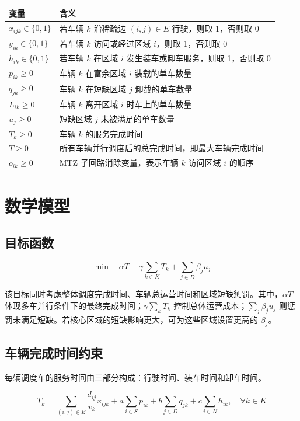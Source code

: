\documentclass[UTF8,a4paper,12pt]{ctexart}
\begin{document}
\begin{longtable}{>{\centering\arraybackslash}p{3cm}p{11cm}}
\toprule
变量 & 含义 \\
\midrule
\endhead
\(x_{ijk}\in\{0,1\}\) & 若车辆 \(k\) 沿稀疏边 \((i,j)\in E\) 行驶，则取 1，否则取 0 \\
\(y_{ik}\in\{0,1\}\) & 若车辆 \(k\) 访问或经过区域 \(i\)，则取 1，否则取 0 \\
\(h_{ik}\in\{0,1\}\) & 若车辆 \(k\) 在区域 \(i\) 发生装车或卸车服务，则取 1，否则取 0 \\
\(p_{ik}\ge 0\) & 车辆 \(k\) 在富余区域 \(i\) 装载的单车数量 \\
\(q_{jk}\ge 0\) & 车辆 \(k\) 在短缺区域 \(j\) 卸载的单车数量 \\
\(L_{ik}\ge 0\) & 车辆 \(k\) 离开区域 \(i\) 时车上的单车数量 \\
\(u_j\ge 0\) & 短缺区域 \(j\) 未被满足的单车数量 \\
\(T_k\ge 0\) & 车辆 \(k\) 的服务完成时间 \\
\(T\ge 0\) & 所有车辆并行调度后的总完成时间，即最大车辆完成时间 \\
\(o_{ik}\ge 0\) & MTZ 子回路消除变量，表示车辆 \(k\) 访问区域 \(i\) 的顺序 \\
\bottomrule
\end{longtable}

\section{数学模型}

\subsection{目标函数}

\[
\min \quad
\alpha T+\gamma\sum_{k\in K}T_k+\sum_{j\in D}\beta_j u_j
\]

该目标同时考虑整体调度完成时间、车辆总运营时间和区域短缺惩罚。其中，\(\alpha T\) 体现多车并行条件下的最终完成时间；\(\gamma\sum_k T_k\) 控制总体运营成本；\(\sum_j\beta_j u_j\) 则惩罚未满足短缺。若核心区域的短缺影响更大，可为这些区域设置更高的 \(\beta_j\)。

\subsection{车辆完成时间约束}

每辆调度车的服务时间由三部分构成：行驶时间、装车时间和卸车时间。

\[
T_k =
\sum_{(i,j)\in E}
\frac{d_{ij}}{v_k}x_{ijk}
+a\sum_{i\in S}p_{ik}
+b\sum_{j\in D}q_{jk}
+c\sum_{i\in N}h_{ik},
\quad \forall k\in K
\]
\end{document}
